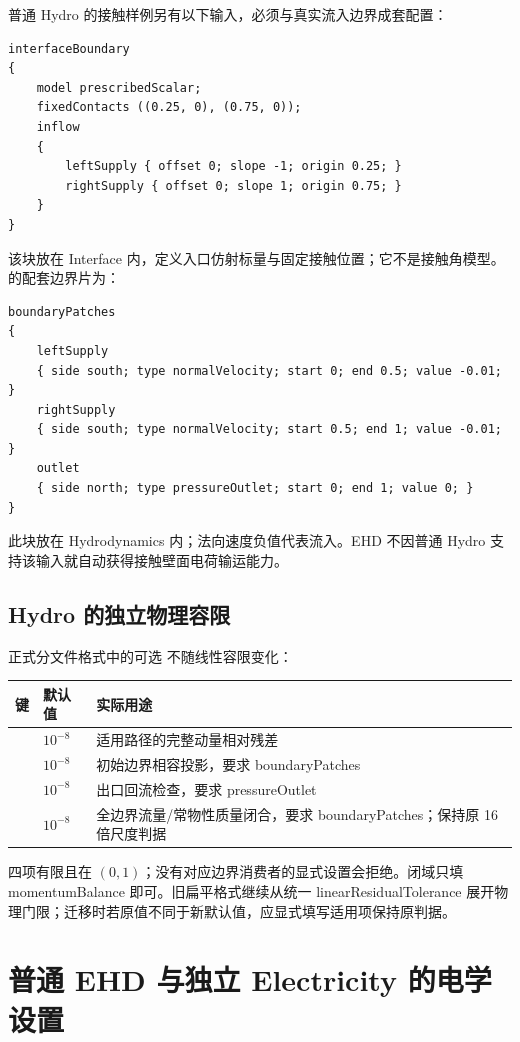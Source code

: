\documentclass[a4paper,11pt]{article}
\begin{document}
普通 Hydro 的接触样例另有以下输入，必须与真实流入边界成套配置：
\begin{lstlisting}
interfaceBoundary
{
    model prescribedScalar;
    fixedContacts ((0.25, 0), (0.75, 0));
    inflow
    {
        leftSupply { offset 0; slope -1; origin 0.25; }
        rightSupply { offset 0; slope 1; origin 0.75; }
    }
}
\end{lstlisting}
该块放在 Interface 内，定义入口仿射标量与固定接触位置；它不是接触角模型。 的配套边界片为：
\begin{lstlisting}
boundaryPatches
{
    leftSupply
    { side south; type normalVelocity; start 0; end 0.5; value -0.01; }
    rightSupply
    { side south; type normalVelocity; start 0.5; end 1; value -0.01; }
    outlet
    { side north; type pressureOutlet; start 0; end 1; value 0; }
}
\end{lstlisting}
此块放在 Hydrodynamics 内；法向速度负值代表流入。EHD 不因普通 Hydro 支持该输入就自动获得接触壁面电荷输运能力。

\subsection{Hydro 的独立物理容限}
正式分文件格式中的可选  不随线性容限变化：
\begin{longtable}{L{.29\linewidth}L{.16\linewidth}L{.47\linewidth}}
\toprule 键 & 默认值 & 实际用途 \\\midrule\endhead
{} & $10^{-8}$ & 适用路径的完整动量相对残差 \\
 & $10^{-8}$ & 初始边界相容投影，要求 boundaryPatches \\
 & $10^{-8}$ & 出口回流检查，要求 pressureOutlet \\
 & $10^{-8}$ & 全边界流量/常物性质量闭合，要求 boundaryPatches；保持原 16 倍尺度判据 \\
\bottomrule
\end{longtable}
四项有限且在 $(0,1)$；没有对应边界消费者的显式设置会拒绝。闭域只填 momentumBalance 即可。旧扁平格式继续从统一 linearResidualTolerance 展开物理门限；迁移时若原值不同于新默认值，应显式填写适用项保持原判据。

\section{普通 EHD 与独立 Electricity 的电学设置}
\end{document}
